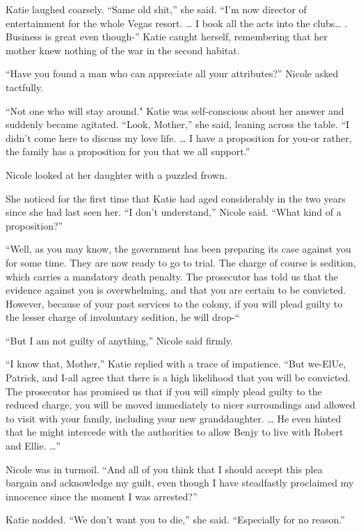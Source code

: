 \documentclass[]{article}
\begin{document}
{{Katie laughed coarsely.  “Same old shit,” she said.  “I’m now director of entertainment for the whole Vegas resort.  … I book all the acts into the clubs… .  Business is great even though-” Katie caught herself, remembering that her mother knew nothing of the war in the second habitat.

“Have you found a man who can appreciate all your attributes?” Nicole asked tactfully.

“Not one who will stay around."  Katie was self-conscious about her answer and suddenly became agitated.  “Look, Mother,” she said, leaning across the table.  “I didn’t come here to discuss my love life.  … I have a proposition for you-or rather, the family has a proposition for you that we all support.”

Nicole looked at her daughter with a puzzled frown.

She noticed for the first time that Katie had aged considerably in the two years since she had last seen her.  “I don’t understand,” Nicole said.  “What kind of a proposition?”

“Well, as you may know, the government has been preparing its case against you for some time.  They are now ready to go to trial.  The charge of course is sedition, which carries a mandatory death penalty.  The prosecutor has told us that the evidence against you is overwhelming, and that you are certain to be convicted.  However, because of your past services to the colony, if you will plead guilty to the lesser charge of involuntary sedition, he will drop-“

“But I am not guilty of anything,” Nicole said firmly.

“I know that, Mother,” Katie replied with a trace of impatience.  “But we-ElUe, Patrick, and I-all agree that there is a high likelihood that you will be convicted.  The prosecutor has promised us that if you will simply plead guilty to the reduced charge, you will be moved immediately to nicer surroundings and allowed to visit with your family, including your new granddaughter.  … He even hinted that he might intercede with the authorities to allow Benjy to live with Robert and Ellie.  …”

Nicole was in turmoil.  “And all of you think that I should accept this plea bargain and acknowledge my guilt, even though I have steadfastly proclaimed my innocence since the moment I was arrested?”

Katie nodded.  “We don’t want you to die,” she said.  “Especially for no reason.”

}}
\end{document}
